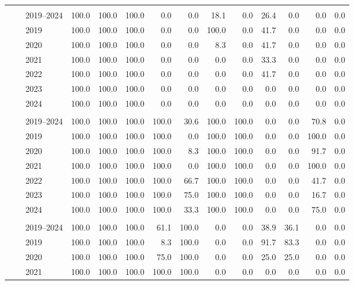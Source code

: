 \begin{table}[htbp]
\begin{tabular}{lllrrrrrrrrrrr}
\addlinespace[2pt]
\multicolumn{14}{l}{\textit{Bogotá --- Female child}} \\
 & & 2019–2024 & 100.0 & 100.0 & 100.0 & 0.0 & 0.0 & 18.1 & 0.0 & 26.4 & 0.0 & 0.0 & 0.0 \\
 & & 2019 & 100.0 & 100.0 & 100.0 & 0.0 & 0.0 & 100.0 & 0.0 & 41.7 & 0.0 & 0.0 & 0.0 \\
 & & 2020 & 100.0 & 100.0 & 100.0 & 0.0 & 0.0 & 8.3 & 0.0 & 41.7 & 0.0 & 0.0 & 0.0 \\
 & & 2021 & 100.0 & 100.0 & 100.0 & 0.0 & 0.0 & 0.0 & 0.0 & 33.3 & 0.0 & 0.0 & 0.0 \\
 & & 2022 & 100.0 & 100.0 & 100.0 & 0.0 & 0.0 & 0.0 & 0.0 & 41.7 & 0.0 & 0.0 & 0.0 \\
 & & 2023 & 100.0 & 100.0 & 100.0 & 0.0 & 0.0 & 0.0 & 0.0 & 0.0 & 0.0 & 0.0 & 0.0 \\
 & & 2024 & 100.0 & 100.0 & 100.0 & 0.0 & 0.0 & 0.0 & 0.0 & 0.0 & 0.0 & 0.0 & 0.0 \\
\addlinespace[2pt]
\multicolumn{14}{l}{\textit{Medellín --- Adult male}} \\
 & & 2019–2024 & 100.0 & 100.0 & 100.0 & 100.0 & 30.6 & 100.0 & 100.0 & 0.0 & 0.0 & 70.8 & 0.0 \\
 & & 2019 & 100.0 & 100.0 & 100.0 & 100.0 & 0.0 & 100.0 & 100.0 & 0.0 & 0.0 & 100.0 & 0.0 \\
 & & 2020 & 100.0 & 100.0 & 100.0 & 100.0 & 8.3 & 100.0 & 100.0 & 0.0 & 0.0 & 91.7 & 0.0 \\
 & & 2021 & 100.0 & 100.0 & 100.0 & 100.0 & 0.0 & 100.0 & 100.0 & 0.0 & 0.0 & 100.0 & 0.0 \\
 & & 2022 & 100.0 & 100.0 & 100.0 & 100.0 & 66.7 & 100.0 & 100.0 & 0.0 & 0.0 & 41.7 & 0.0 \\
 & & 2023 & 100.0 & 100.0 & 100.0 & 100.0 & 75.0 & 100.0 & 100.0 & 0.0 & 0.0 & 16.7 & 0.0 \\
 & & 2024 & 100.0 & 100.0 & 100.0 & 100.0 & 33.3 & 100.0 & 100.0 & 0.0 & 0.0 & 75.0 & 0.0 \\
\addlinespace[2pt]
\multicolumn{14}{l}{\textit{Medellín --- Adult female}} \\
 & & 2019–2024 & 100.0 & 100.0 & 100.0 & 61.1 & 100.0 & 0.0 & 0.0 & 38.9 & 36.1 & 0.0 & 0.0 \\
 & & 2019 & 100.0 & 100.0 & 100.0 & 8.3 & 100.0 & 0.0 & 0.0 & 91.7 & 83.3 & 0.0 & 0.0 \\
 & & 2020 & 100.0 & 100.0 & 100.0 & 75.0 & 100.0 & 0.0 & 0.0 & 25.0 & 25.0 & 0.0 & 0.0 \\
 & & 2021 & 100.0 & 100.0 & 100.0 & 100.0 & 100.0 & 0.0 & 0.0 & 0.0 & 0.0 & 0.0 & 0.0 \\

\end{tabular}
\end{table}
